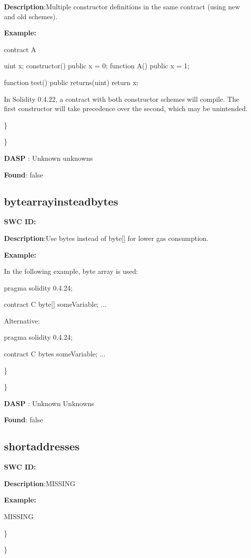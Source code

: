 \documentclass{article}
\begin{document}
{\textbf{Description}:Multiple constructor definitions in the same contract (using new and old schemes).


\textbf{Example:} 

contract A {
    uint x;
    constructor() public {
        x = 0;
    }
    function A() public {
        x = 1;
    }

    function test() public returns(uint) {
        return x;
    }
}

In Solidity 0.4.22, a contract with both constructor schemes will compile. The first constructor will take precedence over the second, which may be unintended.

\} 

\} 

\textbf{DASP} : Unknown unknowns

\textbf{Found}: false

\subsection{byte\textunderscore array\textunderscore instead\textunderscore bytes} 
\textbf{SWC \textunderscore ID:} 

\textbf{Description}:Use bytes instead of byte[] for lower gas consumption.


\textbf{Example:} 

In the following example, byte array is used:

pragma solidity 0.4.24;

contract C {
    byte[] someVariable;
    ...
}

Alternative:

pragma solidity 0.4.24;

contract C {
    bytes someVariable;
    ...
}

\} 

\} 

\textbf{DASP} : Unknown Unknowns

\textbf{Found}: false

\subsection{short\textunderscore addresses} 
\textbf{SWC \textunderscore ID:} 

\textbf{Description}:MISSING


\textbf{Example:} 

MISSING

\} 

\} 

}
\end{document}
